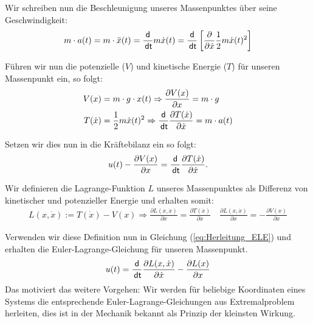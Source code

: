 \documentclass[a4paper, 12pt]{scrartcl}
\newcommand{\dt}{\thinspace \mathsf{dt}}
\begin{document}
Wir schreiben nun die Beschleunigung unseres Massenpunktes über seine Geschwindigkeit:
%
\begin{align*}
    m \cdot a(t)
    =
    m \cdot \ddot{x}(t)
    = 
    \frac{\mathsf{d}}{\dt} m \dot{x}(t)
    =
    \frac{\mathsf{d}}{\dt} 
    \left[
        \frac{\partial}{\partial \dot{x}} \frac{1}{2} m \dot{x}(t)^2
    \right]
\end{align*}

Führen wir nun die potenzielle ($V$) und kinetische Energie ($T$) für 
unseren Massenpunkt ein, so folgt:
%
\begin{align*}
    V(x) 
    &= 
    m \cdot g \cdot x(t) \Rightarrow \frac{\partial V(x)}{\partial x} = m \cdot g
    \\
    T(\dot{x}) 
    &= 
    \frac{1}{2} m \dot{x}(t)^2  \Rightarrow 
    \frac{\mathsf{d}}{\dt} \frac{\partial T(\dot{x})}{\partial \dot{x}} 
    =
    m \cdot a(t)
\end{align*}

Setzen wir dies nun in die Kräftebilanz ein so folgt:
%
\begin{align}
    u(t) - \frac{\partial V(x)}{\partial x}
    =
    \frac{\mathsf{d}}{\dt} \frac{\partial T(\dot{x})}{\partial \dot{x}}.
    \label{eq:Herleitung_ELE}
\end{align}

Wir definieren die Lagrange-Funktion $L$ unseres Massenpunktes als Differenz von
kinetischer und potenzieller Energie und erhalten somit:
%
\begin{align*}
    L(x,\dot{x}) := T(\dot{x}) - V(x) 
    \Rightarrow
    \frac{\partial L(x,\dot{x})}{\partial \dot{x}}
    =
    \frac{\partial T(\dot{x})}{\partial \dot{x}}
    \quad
    \frac{\partial L(x,\dot{x})}{\partial x}
    =
    -\frac{\partial V(x)}{\partial x}
\end{align*}

Verwenden wir diese Definition nun in Gleichung (\ref{eq:Herleitung_ELE})
und erhalten die Euler-Lagrange-Gleichung für unseren Massenpunkt.
%
\begin{align}
    u(t) 
    = 
    \frac{\mathsf{d}}{\dt} \frac{\partial L(x,\dot{x})}{\partial \dot{x}}
    -
    \frac{\partial L(x)}{\partial x}
    \label{eq:ELE_simple}
\end{align}
%
Das motiviert das weitere Vorgehen: Wir werden für beliebige Koordinaten eines Systems 
die entsprechende Euler-Lagrange-Gleichungen aus Extremalproblem herleiten, dies ist 
in der Mechanik bekannt als Prinzip der kleinsten Wirkung. 
\end{document}
